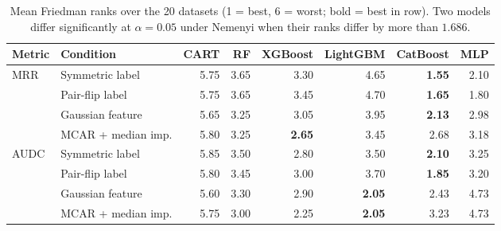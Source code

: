 \begin{table}[t]
\centering
\footnotesize
\setlength{\tabcolsep}{4pt}
\caption{Mean Friedman ranks over the 20 datasets (1 = best, 6 = worst; bold = best in row). Two models differ significantly at $\alpha=0.05$ under Nemenyi when their ranks differ by more than $1.686$.}
\label{tab:ranks}
\begin{tabular*}{\textwidth}{@{\extracolsep{\fill}}llrrrrrr@{}}
\toprule
Metric & Condition & CART & RF & XGBoost & LightGBM & CatBoost & MLP \\
\midrule
MRR & Symmetric label & 5.75 & 3.65 & 3.30 & 4.65 & \textbf{1.55} & 2.10 \\
 & Pair-flip label & 5.75 & 3.65 & 3.45 & 4.70 & \textbf{1.65} & 1.80 \\
 & Gaussian feature & 5.65 & 3.25 & 3.05 & 3.95 & \textbf{2.13} & 2.98 \\
 & MCAR + median imp. & 5.80 & 3.25 & \textbf{2.65} & 3.45 & 2.68 & 3.18 \\
\midrule
AUDC & Symmetric label & 5.85 & 3.50 & 2.80 & 3.50 & \textbf{2.10} & 3.25 \\
 & Pair-flip label & 5.80 & 3.45 & 3.00 & 3.70 & \textbf{1.85} & 3.20 \\
 & Gaussian feature & 5.60 & 3.30 & 2.90 & \textbf{2.05} & 2.43 & 4.73 \\
 & MCAR + median imp. & 5.75 & 3.00 & 2.25 & \textbf{2.05} & 3.23 & 4.73 \\
\bottomrule
\end{tabular*}
\end{table}

